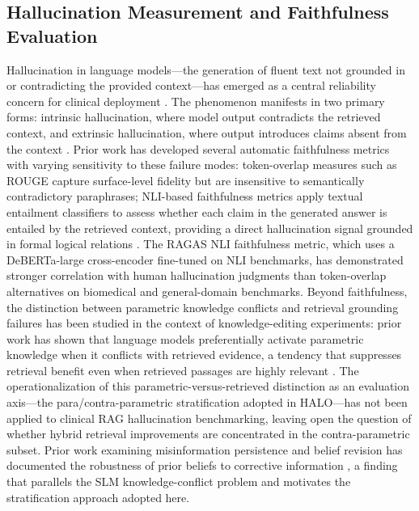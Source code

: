 \documentclass{article}
\begin{document}
\subsection{Hallucination Measurement and Faithfulness Evaluation}

\label{sec:hallucination_measurement_and_faithfulne}

Hallucination in language models---the generation of fluent text not grounded in or contradicting the provided context---has emerged as a central reliability concern for clinical deployment \cite{ji2023survey}. The phenomenon manifests in two primary forms: intrinsic hallucination, where model output contradicts the retrieved context, and extrinsic hallucination, where output introduces claims absent from the context \cite{feuerriegel2023generative}. Prior work has developed several automatic faithfulness metrics with varying sensitivity to these failure modes: token-overlap measures such as ROUGE capture surface-level fidelity but are insensitive to semantically contradictory paraphrases; NLI-based faithfulness metrics apply textual entailment classifiers to assess whether each claim in the generated answer is entailed by the retrieved context, providing a direct hallucination signal grounded in formal logical relations \cite{es2023ragas}. The RAGAS NLI faithfulness metric, which uses a DeBERTa-large cross-encoder fine-tuned on NLI benchmarks, has demonstrated stronger correlation with human hallucination judgments than token-overlap alternatives on biomedical and general-domain benchmarks. Beyond faithfulness, the distinction between parametric knowledge conflicts and retrieval grounding failures has been studied in the context of knowledge-editing experiments: prior work has shown that language models preferentially activate parametric knowledge when it conflicts with retrieved evidence, a tendency that suppresses retrieval benefit even when retrieved passages are highly relevant \cite{min2022rethinking}. The operationalization of this parametric-versus-retrieved distinction as an evaluation axis---the para/contra-parametric stratification adopted in HALO---has not been applied to clinical RAG hallucination benchmarking, leaving open the question of whether hybrid retrieval improvements are concentrated in the contra-parametric subset. Prior work examining misinformation persistence and belief revision has documented the robustness of prior beliefs to corrective information \cite{ecker2022psychological}, a finding that parallels the SLM knowledge-conflict problem and motivates the stratification approach adopted here.
\end{document}

